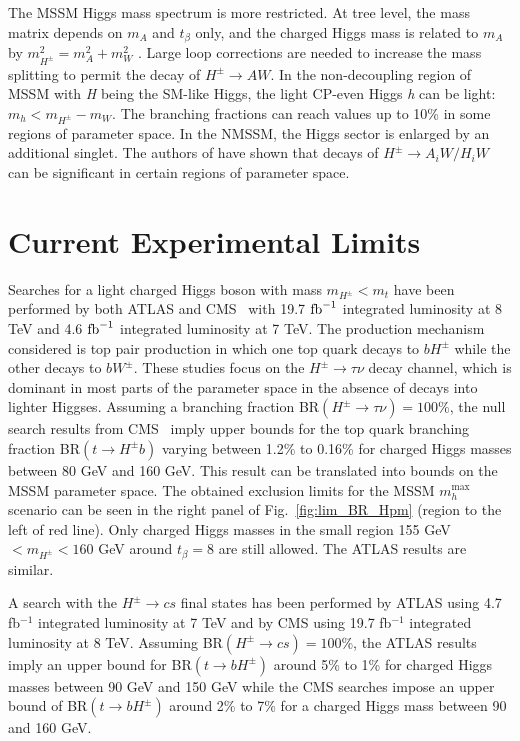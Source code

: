 The MSSM Higgs mass spectrum is more restricted. At tree level, the mass matrix depends on $m_A$ and $t_{\beta}$ only, and the charged Higgs mass is related to $m_A$ by $m_{H^{\pm}}^2 =m_A^2 + m_W^2$ . Large loop corrections are needed to increase the mass splitting to permit the decay of $H^{\pm} \rightarrow A W$. In the non-decoupling region of MSSM with \emph{H} being the SM-like Higgs, the light CP-even Higgs \emph{h} can be light: $m_{h}<m_{H^{\pm}}-m_W$. The branching fractions can reach values up to 10\% \cite{Heinemeyer:2013tqa} in some regions of parameter space. In the NMSSM, the Higgs sector is enlarged by an additional singlet. The authors of \cite{Christensen:2013dra,Drees:1999sb} have shown that decays of $H^{\pm} \rightarrow A_iW/H_iW$ can be significant in certain regions of parameter space. 
 
\section{Current Experimental Limits}
\label{sec:limits}

Searches for a light charged Higgs boson with mass $m_{H^{\pm}}<m_t$ have been performed by both ATLAS and CMS~\cite{TheATLAScollaboration:2013wia,CMS:2014cdp} with 19.7 $ \text{fb}^{-1} $ integrated luminosity at 8 TeV and 4.6 $ \text{fb}^{-1} $ integrated luminosity at 7 TeV. The production mechanism considered is top pair production in which one top quark decays to $bH^{\pm} $ while the other decays to $bW^\pm$. These studies focus on the $H^{\pm} \rightarrow \tau \nu$ decay channel, which is dominant in most parts of the parameter space in the absence of decays into lighter Higgses. Assuming a branching fraction BR$(H^{\pm} \rightarrow \tau \nu) = 100 \%$, the null search results from CMS~\cite{CMS:2014cdp} imply upper bounds for the top quark branching fraction BR$(t \rightarrow H^{\pm} b)$ varying between 1.2\% to 0.16\% for charged Higgs masses between 80 GeV and 160 GeV. This result can be translated into bounds on the MSSM parameter space. The obtained exclusion limits for the MSSM $m_h^\text{max}$ scenario can be seen in the right panel of Fig.~\ref{fig:lim_BR_Hpm} (region to the left of red line). Only charged Higgs masses in the small region 155 GeV $< m_{H^{\pm}} < 160 $ GeV around $t_{\beta} = 8$ are still allowed. The ATLAS results \cite{TheATLAScollaboration:2013wia} are similar.
 
A search with the $H^{\pm} \rightarrow cs$ final states has been performed by ATLAS \cite{Aad:2013hla} using 4.7 fb$^{-1}$ integrated luminosity at 7 TeV and by CMS \cite{CMS:2014kga} using 19.7 fb$^{-1}$ integrated luminosity at 8 TeV. Assuming BR$(H^{\pm} \rightarrow c s) = 100 \%$, the ATLAS results imply an upper bound for BR$(t \rightarrow b H^{\pm} )$ around 5\% to 1\% for charged Higgs masses between 90 GeV and 150 GeV while the CMS searches impose an upper bound of BR$(t \rightarrow b H^{\pm} ) $ around 2\% to 7\% for a charged Higgs mass between 90 and 160 GeV.

